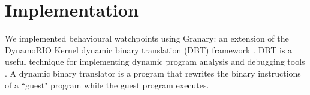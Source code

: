 \documentclass[letterpaper,twocolumn,10pt]{article}
\begin{document}










\section{Implementation}
We implemented behavioural watchpoints using Granary: an extension of the DynamoRIO Kernel dynamic binary translation (DBT) framework \cite{DynamoRIOKernel,GranaryAtOSDI}. DBT is a useful technique for implementing dynamic program analysis and debugging tools \cite{Memcheck,DynamoRIOWatchpoints}. A dynamic binary translator is a program that rewrites the binary instructions of a ``guest" program while the guest program executes.
\end{document}
